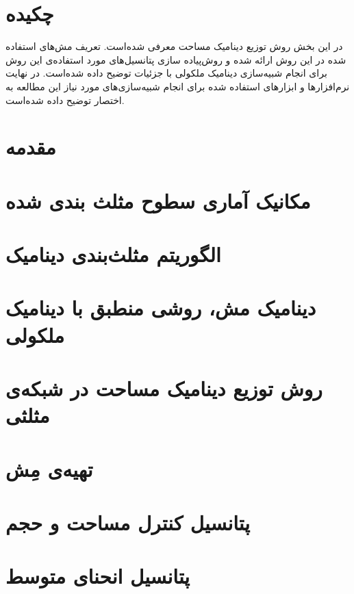 \setRL
\clearpage
\def \MemMethod {\Mempath /MembraneMethod}

\section{
چکیده
}
در این بخش روش توزیع دینامیک مساحت معرفی شده‌است. تعریف مش‌های استفاده شده در این روش ارائه شده و روش‌پیاده سازی پتانسیل‌های مورد استفاده‌ی این روش برای انجام شبیه‌سازی دینامیک ملکولی با جزئیات توضیح داده شده‌است. در نهایت نرم‌افزار‌ها و ابزارهای استفاده شده برای انجام شبیه‌سازی‌های مورد نیاز این مطالعه به اختصار توضیح داده شده‌است.

\section{
مقدمه
}



\section{
مکانیک آماری سطوح مثلث بندی شده
}


\section{
الگوریتم مثلث‌بندی دینامیک
}


\section{
دینامیک مش، روشی منطبق با دینامیک ملکولی
}




\section{
روش توزیع دینامیک مساحت در شبکه‌ی مثلثی
}


\section{
تهیه‌ی مِش
}


\section{
پتانسیل کنترل مساحت و حجم
}


\section{
پتانسیل انحنای متوسط
}



